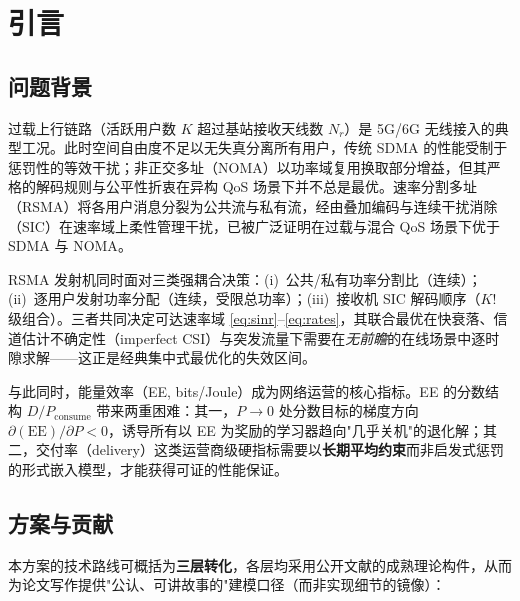 \documentclass[UTF8,11pt,a4paper]{ctexart}
\theoremstyle{plain}
\theoremstyle{definition}
\theoremstyle{remark}
\begin{document}
\section{引言} \label{sec:intro}

\subsection{问题背景}

过载上行链路（活跃用户数 $K$ 超过基站接收天线数 $N_r$）是 5G/6G 无线接入的典型工况。此时空间自由度不足以无失真分离所有用户，传统 SDMA 的性能受制于惩罚性的等效干扰；非正交多址（NOMA）以功率域复用换取部分增益，但其严格的解码规则与公平性折衷在异构 QoS 场景下并不总是最优。速率分割多址（RSMA）将各用户消息分裂为公共流与私有流，经由叠加编码与连续干扰消除（SIC）在速率域上柔性管理干扰，已被广泛证明在过载与混合 QoS 场景下优于 SDMA 与 NOMA\cite{zhang2023pporsma}。

RSMA 发射机同时面对三类强耦合决策：(i)~公共/私有功率分割比（连续）；(ii)~逐用户发射功率分配（连续，受限总功率）；(iii)~接收机 SIC 解码顺序（$K!$ 级组合）。三者共同决定可达速率域 \eqref{eq:sinr}--\eqref{eq:rates}，其联合最优在快衰落、信道估计不确定性（imperfect CSI）与突发流量下需要在\emph{无前瞻}的在线场景中逐时隙求解——这正是经典集中式最优化的失效区间。

与此同时，能量效率（EE, bits/Joule）成为网络运营的核心指标。EE 的分数结构 $D/P_{\mathrm{consume}}$ 带来两重困难：其一，$P\to0$ 处分数目标的梯度方向 $\partial(\mathrm{EE})/\partial P<0$，诱导所有以 EE 为奖励的学习器趋向"几乎关机"的退化解；其二，交付率（delivery）这类运营商级硬指标需要以\textbf{长期平均约束}而非启发式惩罚的形式嵌入模型，才能获得可证的性能保证。

\subsection{方案与贡献}

本方案的技术路线可概括为\textbf{三层转化}，各层均采用公开文献的成熟理论构件，从而为论文写作提供"公认、可讲故事的"建模口径（而非实现细节的镜像）：
\end{document}
